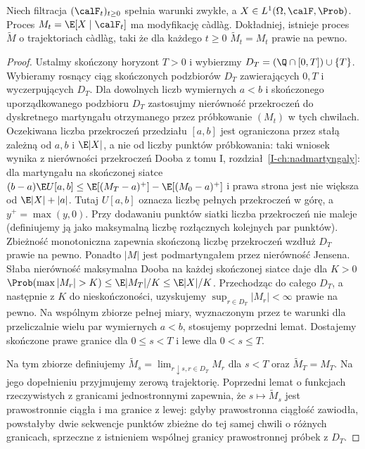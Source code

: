 \begin{twierdzenie}
\label{thm:regularizacja}
Niech filtracja $(\calF_t)_{t\ge0}$ spełnia warunki zwykłe,
a $X\in L^1(\Omega,\calF,\Prob)$. Proces
$M_t=\E[X\mid\calF_t]$ ma modyfikację c\`adl\`ag.
Dokładniej, istnieje proces $\widetilde M$ o trajektoriach
c\`adl\`ag, taki że dla każdego $t\ge0$
$\widetilde M_t=M_t$ prawie na pewno.
\end{twierdzenie}
\begin{proof}
Ustalmy skończony horyzont $T>0$ i wybierzmy
$D_T=(\Q\cap[0,T])\cup\{T\}$.
Wybieramy rosnący ciąg skończonych podzbiorów $D_T$
zawierających $0,T$ i wyczerpujących $D_T$.
Dla dowolnych liczb
wymiernych $a<b$ i skończonego uporządkowanego podzbioru
$D_T$ zastosujmy nierówność przekroczeń do dyskretnego
martyngału otrzymanego przez próbkowanie $(M_t)$ w tych
chwilach. Oczekiwana liczba przekroczeń przedziału
$[a,b]$ jest ograniczona przez stałą zależną od
$a,b$ i $\E|X|$, a nie od liczby punktów próbkowania:
taki wniosek wynika z nierówności przekroczeń
Dooba z tomu I, rozdział~\ref{I-ch:nadmartyngaly}:
dla martyngału na skończonej siatce
$(b-a)\E U[a,b]\le\E[(M_T-a)^+]-\E[(M_0-a)^+]$
i prawa strona jest nie większa od $\E|X|+|a|$.
Tutaj $U[a,b]$ oznacza liczbę pełnych przekroczeń
w górę, a $y^+=\max(y,0)$.
Przy dodawaniu punktów siatki liczba przekroczeń
nie maleje (definiujemy ją jako maksymalną
liczbę rozłącznych kolejnych par punktów).
Zbieżność monotoniczna zapewnia skończoną liczbę
przekroczeń wzdłuż $D_T$ prawie na pewno.
Ponadto $|M|$ jest podmartyngałem przez nierówność
Jensena. Słaba nierówność maksymalna Dooba
na każdej skończonej siatce daje dla $K>0$
$\Prob(\max |M_r|>K)\le \E|M_T|/K\le\E|X|/K$.
Przechodząc do całego $D_T$, a następnie z $K$
do nieskończoności, uzyskujemy
$\sup_{r\in D_T}|M_r|<\infty$ prawie na pewno.
Na wspólnym zbiorze pełnej miary, wyznaczonym
przez te warunki dla przeliczalnie wielu par
wymiernych $a<b$, stosujemy poprzedni lemat.
Dostajemy skończone prawe granice dla $0\le s<T$
i lewe dla $0<s\le T$.

Na tym zbiorze definiujemy
$\widetilde M_s=\lim_{r\downarrow s,r\in D_T}M_r$
dla $s<T$ oraz $\widetilde M_T=M_T$.
Na jego dopełnieniu przyjmujemy zerową trajektorię. Poprzedni lemat
o funkcjach rzeczywistych z granicami jednostronnymi
zapewnia, że $s\mapsto\widetilde M_s$ jest prawostronnie
ciągła i ma granice z lewej: gdyby prawostronna ciągłość
zawiodła, powstałyby dwie sekwencje punktów zbieżne do
tej samej chwili o różnych granicach, sprzeczne z istnieniem
wspólnej granicy prawostronnej próbek z $D_T$.


\end{proof}
